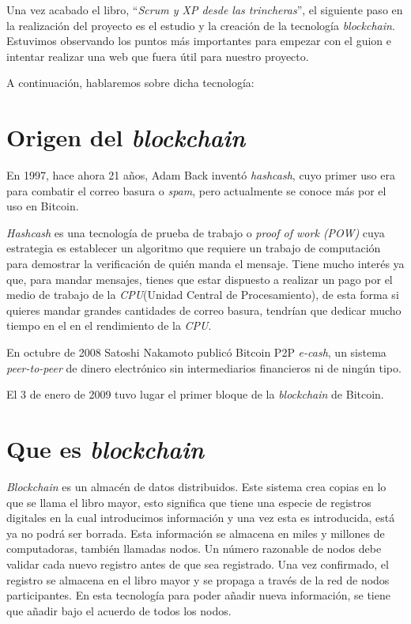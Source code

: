 \newpage
{}
Una vez acabado el libro, ``\textit{Scrum y XP desde las trincheras}'', el siguiente paso en la realización del proyecto es el estudio y la creación de la tecnología \textit{blockchain}. Estuvimos observando los puntos más importantes para empezar con el guion e intentar realizar una web que fuera útil para nuestro proyecto. 

A continuación, hablaremos sobre dicha tecnología: 

\section{Origen del \textit{blockchain}}

En 1997, hace ahora 21 años, Adam Back inventó \textit{hashcash}, cuyo primer uso era para combatir el correo basura o \textit{spam}, pero actualmente se conoce más por el uso en Bitcoin\cite{bitcoin}\cite{bitcoin1}.

\textit{Hashcash}\cite{wiki:HashCash} es una tecnología de prueba de trabajo o \textit{proof of work (POW)} cuya estrategia es establecer un algoritmo que requiere un trabajo de computación para demostrar la verificación de quién manda el mensaje. Tiene mucho interés ya que, para mandar mensajes, tienes que estar dispuesto a realizar un pago por el medio de trabajo de la \textit{CPU}(Unidad Central de Procesamiento), de esta forma si quieres mandar grandes cantidades de correo basura, tendrían que dedicar mucho tiempo en el en el rendimiento de la \textit{CPU}.


En octubre de 2008 Satoshi Nakamoto publicó Bitcoin P2P \textit{e-cash}, un sistema \textit{peer-to-peer} de dinero electrónico sin intermediarios financieros ni de ningún tipo. 

El 3 de enero de 2009 tuvo lugar el primer bloque de la \textit{blockchain} de Bitcoin.

\section{Que es \textit{blockchain}}
\textit{Blockchain}\cite{blockcahin} es un almacén de datos distribuidos. Este sistema crea copias en lo que se llama el libro mayor, esto significa que tiene una especie de registros digitales en la cual introducimos información y una vez esta es introducida, está ya no podrá ser borrada. Esta información se almacena en miles y millones de computadoras, también llamadas nodos. Un número razonable de nodos debe validar cada nuevo registro antes de que sea registrado. Una vez confirmado, el registro se almacena en el libro mayor y se propaga a través de la red de nodos participantes. En esta tecnología para poder añadir nueva información, se tiene que añadir bajo el acuerdo de todos los nodos.
 
